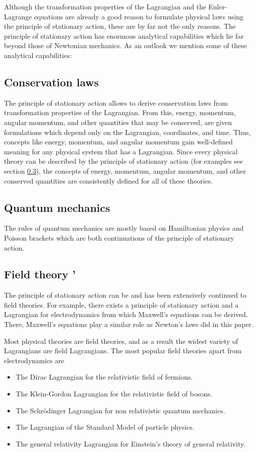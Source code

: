\documentclass[prb,preprint]{revtex4-1}
\begin{document}
Although the transformation properties of the Lagrangian and the Euler-Lagrange equations are already a good reason to formulate physical laws using the principle of stationary action, these are by far not the only reasons. The principle of stationary action has enormous analytical capabilities which lie far beyond those of Newtonian mechanics. As an outlook we mention some of these analytical capabilities:

\subsection{Conservation laws \cite{KleinertConservation}}
The principle of stationary action allows to derive conservation laws from transformation properties of the Lagrangian. From this, energy, momentum, angular momentum, and other quantities that may be conserved, are given formulations which depend only on the Lagrangian, coordinates, and time. Thus, concepts like energy, momentum, and angular momentum gain well-defined meaning for any physical system that has a Lagrangian. Since every physical theory can be described by the principle of stationary action (for examples see section \ref{field.theory}), the concepts of energy, momentum, angular momentum, and other conserved quantities are consistently defined for all of these theories.

\subsection{Quantum mechanics \cite{Schwabl}}
The rules of quantum mechanics are mostly based on Hamiltonian physics and Poisson brackets which are both continuations of the principle of stationary action.

\subsection{Field theory \cite{Sterman}'\cite{Dirac}} \label{field.theory}
The principle of stationary action can be and has been extensively continued to field theories. For example, there exists a principle of stationary action and a Lagrangian for electrodynamics from which Maxwell's equations can be derived. There, Maxwell's equations play a similar role as Newton's laws did in this paper.

Most physical theories are field theories, and as a result the widest variety of Lagrangians are field Lagrangians. The most popular field theories apart from electrodynamics are
\begin{itemize}
  \item The Dirac Lagrangian for the relativistic field of fermions.
  \item The Klein-Gordon Lagrangian for the relativistic field of bosons.
  \item The Schr{\"o}dinger Lagrangian for non relativistic quantum mechanics.
  \item The Lagrangian of the Standard Model of particle physics.
  \item The general relativity Lagrangian for Einstein's theory of general relativity.
\end{itemize}
\end{document}
